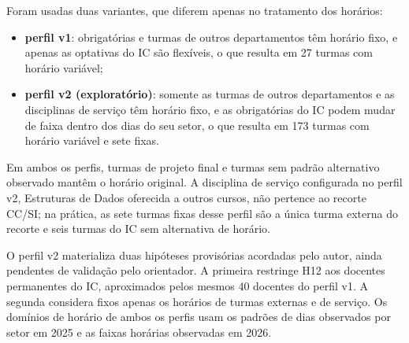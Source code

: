 Foram usadas duas variantes, que diferem apenas no tratamento dos horários:
\begin{itemize}
  \item \textbf{perfil v1}: obrigatórias e turmas de outros departamentos têm horário fixo, e apenas as optativas do IC são flexíveis, o que resulta em 27 turmas com horário variável;
  \item \textbf{perfil v2 (exploratório)}: somente as turmas de outros departamentos e as disciplinas de serviço têm horário fixo, e as obrigatórias do IC podem mudar de faixa dentro dos dias do seu setor, o que resulta em 173 turmas com horário variável e sete fixas.
\end{itemize}

Em ambos os perfis, turmas de projeto final e turmas sem padrão alternativo observado mantêm o horário original. A disciplina de serviço configurada no perfil v2, Estruturas de Dados oferecida a outros cursos, não pertence ao recorte CC/SI; na prática, as sete turmas fixas desse perfil são a única turma externa do recorte e seis turmas do IC sem alternativa de horário.

O perfil v2 materializa duas hipóteses provisórias acordadas pelo autor, ainda pendentes de validação pelo orientador. A primeira restringe H12 aos docentes permanentes do IC, aproximados pelos mesmos 40 docentes do perfil v1. A segunda considera fixos apenas os horários de turmas externas e de serviço. Os domínios de horário de ambos os perfis usam os padrões de dias observados por setor em 2025 e as faixas horárias observadas em 2026. 

